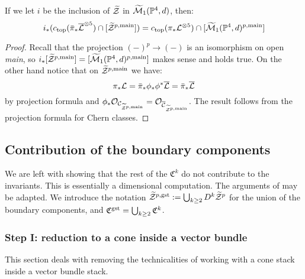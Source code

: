 \begin{lem}\label{lem:main-compo}
 If we let $i$ be the inclusion of $\widetilde{\mathcal Z}$ in $\widetilde{\mathcal{M}}_1(\mathbb P^4,d)$, then:
 \[
  i_*(c_{\rm{top}}(\bar{\pi}_*\overline{\mathcal{L}}^{\otimes 5})\cap[\widetilde{\mathcal Z}^{p,\rm{main}}])=c_{\rm{top}}({\pi}_*\mathcal L^{\otimes 5})\cap[\widetilde{\mathcal{M}}_1(\mathbb P^4,d)^{p,\rm{main}}]
 \]
\end{lem}
\begin{proof}
 Recall that the projection $(-)^p\to (-)$ is an isomorphism on open \emph{main}, so $i_*[\widetilde{\mathcal Z}^{p,\rm{main}}]=[\widetilde{\mathcal{M}}_1(\mathbb P^4,d)^{p,\rm{main}}]$ makes sense and holds true. On the other hand notice that on $\widetilde{\mathcal Z}^{p,\rm{main}}$ we have:
 \[
  \pi_*\mathcal L=\bar{\pi}_*\phi_*\phi^*\overline{\mathcal{L}}=\bar{\pi}_*\overline{\mathcal{L}}
 \]
by projection formula and $\phi_*\mathcal{O}_{\mathcal{C}_{\widetilde{\mathcal Z}^{p,\rm{main}}}}=\mathcal{O}_{\overline{\mathcal{C}}_{\widetilde{\mathcal Z}^{p,\rm{main}}}}$. The result follows from the projection formula for Chern classes.
\end{proof}

\subsection{Contribution of the boundary components} We are left with showing that the rest of the $\mathfrak C^k$ do not contribute to the invariants. This is essentially a dimensional computation. The arguments of \cite[\S\S6-8]{CL-pfields} may be adapted. We introduce the notation $\widetilde{\mathcal Z}^{p,\rm{gst}}:=\bigcup_{k\geq 2} D^k\widetilde{\mathcal Z}^p$ for the union of the boundary components, and $\mathfrak C^{\rm{gst}}=\bigcup_{k\geq 2}\mathfrak C^k$.

\subsubsection{Step I: reduction to a cone inside a vector bundle}

This section deals with removing the technicalities of working with a cone stack inside a vector bundle stack.

